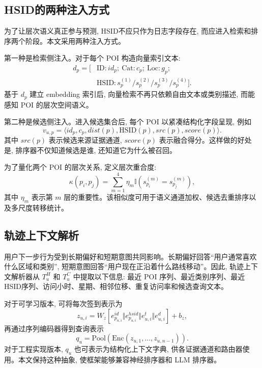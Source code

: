 \documentclass[10pt,twocolumn,fontset=none]{ctexart}
\newcommand{\hsid}{HSID}
\begin{document}
\subsection{\hsid 的两种注入方式}
为了让层次语义真正参与预测, \hsid 不应只作为日志字段存在, 而应进入检索和排序两个阶段。本文采用两种注入方式。

第一种是检索侧注入。对于每个 POI 构造向量索引文本:
\begin{equation}
\begin{split}
    d_p = [&\mathrm{ID}: id_p;\ \mathrm{Cat}: c_p;\ \mathrm{Loc}: g_p;\\
           &\mathrm{HSID}: s^{(1)}_p/s^{(2)}_p/s^{(3)}_p/s^{(4)}_p].
\end{split}
\end{equation}
基于 $d_p$ 建立 embedding 索引后, 向量检索不再只依赖自由文本或类别描述, 而能感知 POI 的层次空间语义。

第二种是候选侧注入。进入候选集合后, 每个 POI 以紧凑结构化字段呈现, 例如
\begin{equation}
    v_{u,p}=\langle id_p,c_p,dist(p),\mathrm{HSID}(p),src(p),score(p)\rangle.
\end{equation}
其中 $src(p)$ 表示候选来源证据通道, $score(p)$ 表示融合得分。这样做的好处是, 排序器不仅知道候选是谁, 还知道它为什么被召回。

为了量化两个 POI 的层次关系, 定义层次重合度:
\begin{equation}
    \kappa(p_i,p_j)=\sum_{m=1}^{4}\eta_m\mathbb I(s^{(m)}_{p_i}=s^{(m)}_{p_j}),
\end{equation}
其中 $\eta_m$ 表示第 $m$ 层的重要性。该相似度可用于语义通道加权、候选去重排序以及多尺度转移统计。

\subsection{轨迹上下文解析}
用户下一步行为受到长期偏好和短期意图共同影响。长期偏好回答“用户通常喜欢什么区域和类别”, 短期意图回答“用户现在正沿着什么路线移动”。因此, 轨迹上下文解析器从 $T^H_u$ 和 $T^C_u$ 中提取以下信息: 最近 POI 序列、最近类别序列、最近 \hsid 序列、访问小时、星期、相邻位移、重复访问率和候选查询文本。

对于可学习版本, 可将每次签到表示为
\begin{equation}
    z_{u,i}=W_z[e^{id}_{p_{u,i}}\Vert e^{hsid}_{p_{u,i}}\Vert e^t_{u,i}\Vert e^d_{u,i}]+b_z,
\end{equation}
再通过序列编码器得到查询表示
\begin{equation}
    q_u=\mathrm{Pool}(\mathrm{Enc}(z_{u,1},\ldots,z_{u,n-1})).
\end{equation}
对于工程实现版本, $q_u$ 也可表示为结构化上下文字典, 供各证据通道和路由器使用。本文保持这种抽象, 使框架能够兼容神经排序器和 LLM 排序器。
\end{document}
